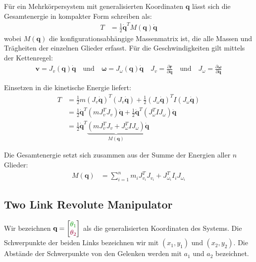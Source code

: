 \documentclass[a4paper, 12pt]{scrartcl}
\newcommand{\gruen}[2][gruen]{\textcolor{#1}{#2}}
\newcommand{\dunkelrot}[2][dunkelrot]{\textcolor{#1}{#2}}
\begin{document}
Für ein Mehrkörpersystem mit generalisierten 
Koordinaten $\textbf{q}$ lässt sich die Gesamtenergie in 
kompakter Form schreiben als:
%
\begin{align*}
T &= \frac{1}{2} \dot{\textbf{q}}^T M(\textbf{q}) \dot{\textbf{q}}
\end{align*}
%
wobei $M(\textbf{q})$ die konfigurationsabhängige Massenmatrix ist, 
die alle Massen und Trägheiten der einzelnen Glieder erfasst.
Für die Geschwindigkeiten gilt mittels der Kettenregel:
\begin{align*}
    \textbf{v} = J_v(\textbf{q}) \dot{\textbf{q}} \quad \text{und} \quad
    \boldsymbol{\omega} = J_\omega(\textbf{q}) \dot{\textbf{q}}
    \quad
    J_v = \frac{\partial \textbf{r}}{\partial \textbf{q}} 
    \quad \text{und} \quad  
    J_\omega = \frac{\partial \boldsymbol{\omega}}{\partial \dot{\textbf{q}}}
\end{align*}

Einsetzen in die kinetische Energie liefert:
\begin{align*}
    T 
    &= \frac{1}{2} m (J_v \dot{\textbf{q}})^T (J_v \dot{\textbf{q}}) 
    + \frac{1}{2} (J_\omega \dot{\textbf{q}})^T I (J_\omega \dot{\textbf{q}}) \\
    &= \frac{1}{2} \dot{\textbf{q}}^T (m J_v^T J_v) \dot{\textbf{q}} 
    + \frac{1}{2} \dot{\textbf{q}}^T (J_\omega^T I J_\omega) \dot{\textbf{q}} \\
    &= \frac{1}{2} \dot{\textbf{q}}^T 
    \underbrace{\left( m J_v^T J_v + J_\omega^T I J_\omega \right)}_{M(\textbf{q})} 
    \dot{\textbf{q}}
\end{align*}

Die Gesamtenergie setzt sich zusammen 
aus der Summe der Energien aller $n$ Glieder:
\begin{align*}
    M(\textbf{q}) 
    &=
    \sum_{i=1}^n m_i J_{v_i}^T J_{v_i} + J_{\omega_i}^T I_i J_{\omega_i} 
\end{align*}

\subsection{Two Link Revolute Manipulator}

Wir bezeichnen $\textbf{q} = 
\begin{bmatrix} \gruen{\theta_1} \\ \dunkelrot{\theta_2} \end{bmatrix}$ 
als die generalisierten Koordinaten des Systems. Die Schwerpunkte der beiden Links
bezeichnen wir mit $(x_1, y_1)$ und $(x_2, y_2)$. Die Abstände der Schwerpunkte
von den Gelenken werden mit $a_1$ und $a_2$ bezeichnet.
\end{document}
